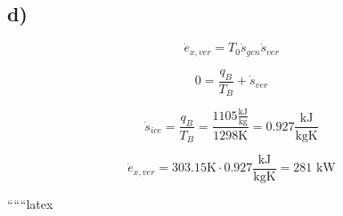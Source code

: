 

\subsection*{d)}

\[
\dot{e}_{x,ver} = T_0 \dot{s}_{gen} \dot{s}_{ver}
\]

\[
0 = \frac{q_B}{T_B} + \dot{s}_{ver}
\]

\[
\dot{s}_{ice} = \frac{q_B}{T_B} = \frac{1105 \frac{\text{kJ}}{\text{kg}}}{1298 \text{K}} = 0.927 \frac{\text{kJ}}{\text{kgK}}
\]

\[
\dot{e}_{x,ver} = 303.15 \text{K} \cdot 0.927 \frac{\text{kJ}}{\text{kgK}} = 281 \text{ kW}
\]

``````latex